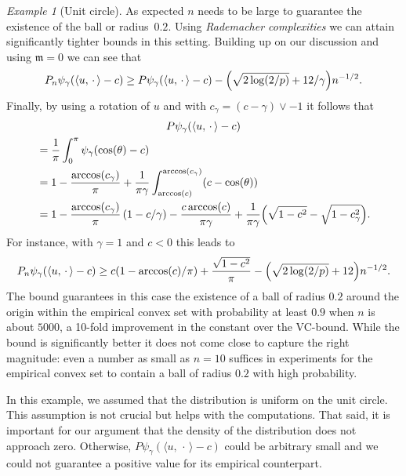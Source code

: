 \documentclass[10pt]{amsart}
\theoremstyle{definition}\newtheorem{defi}[theo]{Definition}\newtheorem{rema}[theo]{Remark}\newtheorem{exam}[theo]{Example}\newtheorem{exem}[theo]{Example}\newtheorem{nota}[theo]{Notation}
\theoremstyle{remark}
\newtheorem{examl}{Example}
\newcommand{\mean}{\mathfrak{m}}
\let\originalleft\left
\let\originalright\right
\renewcommand{\left}{\mathopen{}\mathclose\bgroup\originalleft}
\renewcommand{\right}{\aftergroup\egroup\originalright}
\begin{document}
\begin{examl}[{Unit circle}]
As expected $n$ needs to be large to guarantee the existence of the ball or radius~$0.2$. Using \emph{Rademacher complexities} we can attain significantly tighter bounds in this setting. Building up on our discussion and using $\mean=0$ we can see that
\[
P_n \psi_\gamma(\langle u, \,\cdot\, \rangle -c) \geq P \psi_\gamma(\langle u, \,\cdot\, \rangle -c) - \left(
\sqrt{2\log(2/p)} + 12/\gamma\right) n^{-1/2}.
\]
Finally, by using a rotation of $u$ and with $c_\gamma = (c- \gamma) \vee -1$ it follows that
\begin{multline*}
P \psi_\gamma(\langle u, \,\cdot\, \rangle -c)\\
\begin{aligned}
&= \frac{1}{\pi} \int_0^\pi \psi_\gamma(\cos(\theta) - c)
\\
&= 1- \frac{\arccos(c_\gamma)}{\pi} + \frac{1}{\pi\gamma} \int_{\arccos(c)}^{\arccos(c_\gamma)} (c-\cos(\theta)) \\
&= 1 - \frac{\arccos(c_\gamma)}{\pi} \, (1- c/\gamma) -
\frac{c \arccos(c)}{\pi \gamma} +\frac{1}{\pi\gamma} \left(\sqrt{1-c^2} - \sqrt{1-c_\gamma^2}\right).
\end{aligned}
\end{multline*}
For instance, with $\gamma=1$ and $c<0$ this leads to
\begin{align*}
P_n \psi_\gamma(\langle u, \,\cdot\, \rangle -c) \geq c (1- \arccos(c)/\pi) + \frac{\sqrt{1-c^2}}{\pi} - \left(\sqrt{2\log(2/p)} + 12\right) n^{-1/2}.
\end{align*}
The bound guarantees in this case the existence of a ball of radius $0.2$ around the origin within the empirical convex set with probability at least $0.9$ when $n$ is about $5000$, a 10-fold improvement in the constant over the VC-bound. While the bound is significantly better it does not come close to capture the right magnitude: even a number as small as $n=10$ suffices in experiments for the empirical convex set to contain a ball of radius $0.2$ with high probability.

In this example, we assumed that the distribution is uniform on the unit circle. This assumption is not crucial but helps with the computations. That said, it is important for our argument that the density of the distribution does not approach zero. Otherwise, $P\psi_\gamma(\langle u, \,\cdot\, \rangle -c)$ could be arbitrary small and we could not guarantee a positive value for its empirical counterpart.
\end{examl}


\end{document}
